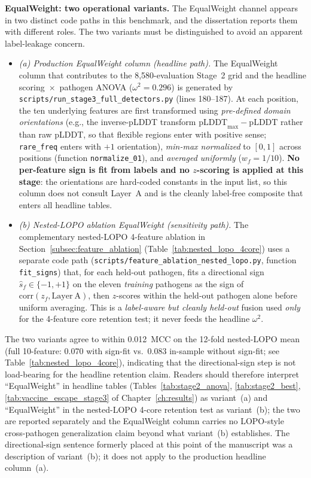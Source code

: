 \textbf{EqualWeight: two operational variants.}\label{subsubsec:equalweight_variants} The EqualWeight channel appears in two distinct code paths in this benchmark, and the dissertation reports them with different roles. The two variants must be distinguished to avoid an apparent label-leakage concern.
\begin{itemize}
\item \emph{(a) Production EqualWeight column (headline path).} The EqualWeight column that contributes to the 8{,}580-evaluation Stage~2 grid and the headline scoring~$\times$~pathogen ANOVA ($\omega^2 = 0.296$) is generated by \texttt{scripts/run\_stage3\_full\_detectors.py} (lines 180--187). At each position, the ten underlying features are first transformed using \emph{pre-defined domain orientations} (e.g., the inverse-pLDDT transform $\text{pLDDT}_{\max} - \text{pLDDT}$ rather than raw pLDDT, so that flexible regions enter with positive sense; \texttt{rare\_freq} enters with $+1$ orientation), \emph{min-max normalized} to $[0,1]$ across positions (function \texttt{normalize\_01}), and \emph{averaged uniformly} ($w_f = 1/10$). \textbf{No per-feature sign is fit from labels and no $z$-scoring is applied at this stage}: the orientations are hard-coded constants in the input list, so this column does not consult Layer~A and is the cleanly label-free composite that enters all headline tables.
\item \emph{(b) Nested-LOPO ablation EqualWeight (sensitivity path).} The complementary nested-LOPO 4-feature ablation in Section~\ref{subsec:feature_ablation} (Table~\ref{tab:nested_lopo_4core}) uses a separate code path (\texttt{scripts/feature\_ablation\_nested\_lopo.py}, function \texttt{fit\_signs}) that, for each held-out pathogen, fits a directional sign $\hat{s}_f \in \{-1, +1\}$ on the eleven \emph{training} pathogens as the sign of $\mathrm{corr}(z_f, \mathrm{Layer~A})$, then $z$-scores within the held-out pathogen alone before uniform averaging. This is a \emph{label-aware but cleanly held-out} fusion used \emph{only} for the 4-feature core retention test; it never feeds the headline $\omega^2$.
\end{itemize}
The two variants agree to within 0.012~MCC on the 12-fold nested-LOPO mean (full 10-feature: 0.070 with sign-fit vs.\ 0.083 in-sample without sign-fit; see Table~\ref{tab:nested_lopo_4core}), indicating that the directional-sign step is not load-bearing for the headline retention claim. Readers should therefore interpret ``EqualWeight'' in headline tables (Tables~\ref{tab:stage2_anova}, \ref{tab:stage2_best}, \ref{tab:vaccine_escape_stage3} of Chapter~\ref{ch:results}) as variant~(a) and ``EqualWeight'' in the nested-LOPO 4-core retention test as variant~(b); the two are reported separately and the EqualWeight column carries no LOPO-style cross-pathogen generalization claim beyond what variant~(b) establishes. The directional-sign sentence formerly placed at this point of the manuscript was a description of variant~(b); it does not apply to the production headline column~(a).

